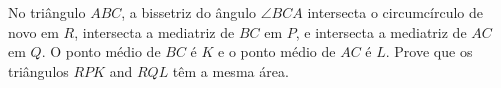 No triângulo $ABC$, a bissetriz do ângulo $\angle BCA$ intersecta o circumcírculo de novo em $R$, intersecta a mediatriz de $BC$ em $P$, e intersecta a mediatriz de $AC$ em $Q$.
O ponto médio de $BC$ é $K$ e o ponto médio de $AC$ é $L$.
Prove que os triângulos $RPK$ and $RQL$ têm a mesma área.
